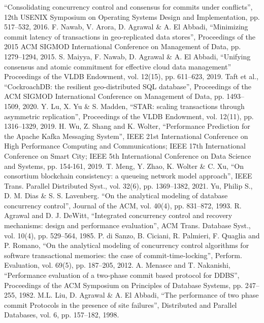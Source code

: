 \begin{thebibliography}{00}
  ``Consolidating concurrency control and consensus for commits under conflicts'',
  12th {USENIX} Symposium on Operating Systems Design and Implementation,
  pp. 517--532,
  2016.
  F. Nawab, V. Arora, D. Agrawal \& A. El Abbadi,
  ``Minimizing commit latency of transactions in geo-replicated data stores'',
  Proceedings of the 2015 {ACM} {SIGMOD} International Conference on Management
  of Data,
  pp. 1279--1294,
  2015.
  S. Maiyya, F. Nawab, D. Agrawal \& A. El Abbadi,
  ``Unifying consensus and atomic commitment for effective cloud data management''
  Proceedings of the VLDB Endowment,
  vol. 12(15),
  pp. 611--623,
  2019.
  Taft et al.,
  ``CockroachDB: the resilient geo-distributed {SQL} database'',
  Proceedings of the {ACM} {SIGMOD} International Conference on Management of
  Data,
  pp. 1493--1509,
  2020.
  Y. Lu, X. Yu \& S. Madden,
  ``{STAR}: scaling transactions through asymmetric replication'',
  Proceedings of the VLDB Endowment,
  vol. 12(11),
  pp. 1316--1329,
  2019.
  H. Wu, Z. Shang and K. Wolter,
  ``Performance Prediction for the Apache Kafka Messaging System'',
  {IEEE} 21st International Conference on High Performance Computing and Communications;
  {IEEE} 17th International Conference on Smart City;
  {IEEE} 5th International Conference on Data Science and Systems,
  pp. 154-161,
  2019.
  T. Meng, Y. Zhao, K. Wolter \& C. Xu,
  ``On consortium blockchain consistency: {a} queueing network model approach'',
  {IEEE} Trans. Parallel Distributed Syst.,
  vol. 32(6),
  pp. 1369--1382,
  2021.
  Yu, Philip S., D. M. Dias \& S. S. Lavenberg.
  ``On the analytical modeling of database concurrency control'',
  Journal of the ACM,
  vol. 40(4), 
  pp. 831--872,
  1993.
  R. Agrawal and D. J. DeWitt,
  ``Integrated concurrency control and recovery mechanisms: design and performance evaluation'',
  {ACM} Trans. Database Syst.,
  vol. 10(4),
  pp. 529--564,
  1985.
  P. di Sanzo, B. Ciciani, R. Palmieri, F. Quaglia and P. Romano,
  ``On the analytical modeling of concurrency control algorithms for software transactional memories: the case of commit-time-locking'',
  Perform. Evaluation,
  vol. 69(5),
  pp. 187--205,
  2012.
  A. Menasce and T. Nakanishi,
  ``Performance evaluation of a two-phase commit based protocol for {DDBS}'',
  Proceedings of the {ACM} Symposium on Principles of Database Systems,
  pp. 247--255,
  1982.  
  M.L. Liu, D. Agrawal \& A. El Abbadi,
  ``The performance of two phase commit Protocols in the presence of site failures'',
  Distributed and Parallel Databases,
  vol. 6,
  pp. 157--182,
  1998.

\end{thebibliography}
\vspace{12pt}


